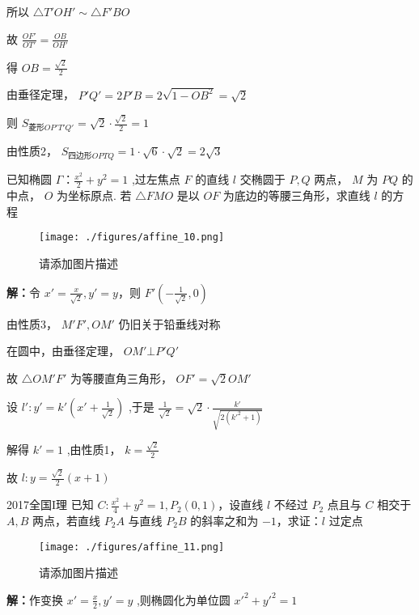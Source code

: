 \begin{corollary}{}
\begin{example}{}
所以 $\displaystyle{\triangle T'OH'\sim\triangle F'BO}$

故 $\displaystyle{\frac{OF'}{OT'}=\frac{OB}{OH'}}$

得 $\displaystyle{OB=\frac{\sqrt{2}}{2}}$

由垂径定理， $\displaystyle{P'Q'=2P'B=2\sqrt{1-OB^2}=\sqrt{2}}$

则 $\displaystyle{S_{菱形OP'T'Q'}=\sqrt{2}\cdot\frac{\sqrt{2}}{2}=1}$

由性质2， $\displaystyle{S_{四边形OPTQ}=1\cdot \sqrt{6}\cdot\sqrt{2}=2\sqrt{3}}$ 
\end{example}

\begin{example}{}
已知椭圆 $\displaystyle{\Gamma：\frac{x^2}{2}+y^2=1}$ ,过左焦点 $\displaystyle{F}$ 的直线 $\displaystyle{l}$ 交椭圆于 $\displaystyle{P,Q}$ 两点， $\displaystyle{M}$ 为 $\displaystyle{PQ}$ 的中点， $\displaystyle{O}$ 为坐标原点. 若 $\displaystyle{\triangle FMO}$ 是以 $\displaystyle{OF}$ 为底边的等腰三角形，求直线 $\displaystyle{l}$  的方程
\begin{figure}[ht]
\centering
\texttt{[image: ./figures/affine\_10.png]}
\caption{请添加图片描述} \label{affine_fig10}
\end{figure}
\textbf{解：}令 $\displaystyle{x'=\frac{x}{\sqrt{2}},y'=y}$，则 $\displaystyle{F'(-\frac{1}{\sqrt{2}},0)}$

由性质3， $\displaystyle{M'F',OM'}$ 仍旧关于铅垂线对称

在圆中，由垂径定理， $\displaystyle{OM'\bot P'Q'}$

故 $\displaystyle{\triangle OM'F'}$ 为等腰直角三角形， $\displaystyle{OF'=\sqrt{2} OM'}$

设 $\displaystyle{l':y'=k'\left(x'+\frac{1}{\sqrt{2}}\right)}$ ,于是 $\displaystyle{\frac{1}{\sqrt{2}}=\sqrt{2}\cdot \frac{k'}{\sqrt{2(k'^2+1)}}}$

解得 $\displaystyle{k'=1}$ ,由性质1， $\displaystyle{k=\frac{\sqrt{2}}{2}}$

故 $\displaystyle{l:y=\frac{\sqrt{2}}{2}(x+1)}$ 
\end{example}

\begin{example}{2017全国I理}
已知 $\displaystyle{C:\frac{x^2}4+y^2=1,P_2(0,1)}$，设直线 $\displaystyle{l}$ 不经过 $\displaystyle{P_2}$ 点且与 $\displaystyle{C}$ 相交于 $\displaystyle{A,B}$ 两点，若直线 $\displaystyle{P_2A}$ 与直线 $\displaystyle{P_2B}$ 的斜率之和为 $\displaystyle{-1}$，求证：$\displaystyle{l}$ 过定点
\begin{figure}[ht]
\centering
\texttt{[image: ./figures/affine\_11.png]}
\caption{请添加图片描述} \label{affine_fig11}
\end{figure}
\textbf{解：}作变换 $\displaystyle{x'=\frac{x}{2},y'=y}$ ,则椭圆化为单位圆 $\displaystyle{x'^2+y'^2=1}$


\end{example}
\end{corollary}
